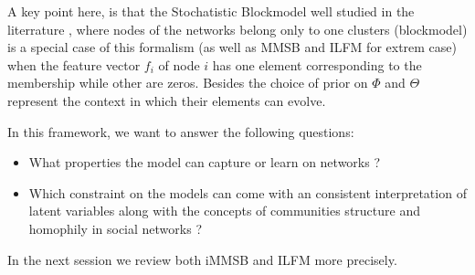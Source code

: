 A key point here, is that the Stochatistic Blockmodel well studied in the literrature \cite{goldenberg2010survey}, where nodes of the networks belong only to one clusters (blockmodel) is a special case of this formalism (as well as MMSB and ILFM for extrem case) when the feature vector $f_i$ of node $i$ has one element corresponding to the membership while other are zeros. Besides the choice of prior on $\Phi$ and $\Theta$ represent the context in which  their elements can evolve.

In this framework, we want to answer the following questions:
\begin{itemize}
	\item What properties the model can capture or learn on networks ?
	\item Which constraint on the models can come with an consistent interpretation of latent variables along with the concepts of communities structure and homophily in social networks  ?
\end{itemize} 


In the next session we review both iMMSB and ILFM more precisely.

